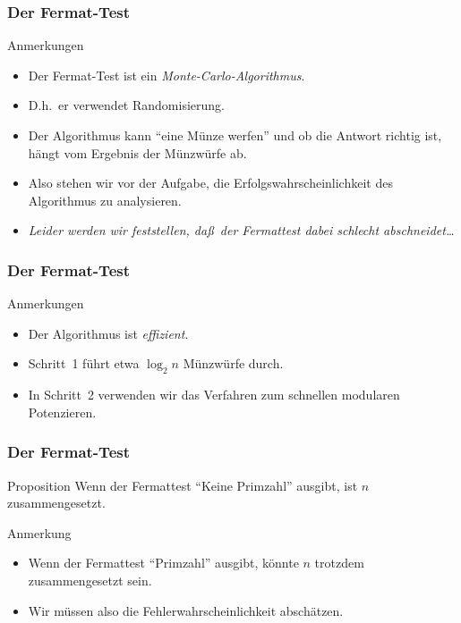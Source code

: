 \documentclass{beamer}
\renewcommand{\emph}[1]{{\textcolor{solarizedRed}{\itshape #1}}}
\renewcommand{\ae}{\"a}
\renewcommand{\oe}{\"o}
\newcommand{\ue}{\"u}
\begin{document}
\begin{frame}\frametitle{Der Fermat-Test}
	\begin{block}{Anmerkungen}
		\begin{itemize}
			\item Der Fermat-Test ist ein \emph{Monte-Carlo-Algorithmus}.
			\item D.h.\ er verwendet Randomisierung.
			\item Der Algorithmus kann ``eine M\ue nze werfen'' und ob die Antwort richtig ist, h\ae ngt vom Ergebnis der M\ue nzw\ue rfe ab.
			\item Also stehen wir vor der Aufgabe, die Erfolgswahrscheinlichkeit des Algorithmus zu analysieren.
			\item \itshape Leider werden wir feststellen, da\ss\ der Fermattest dabei schlecht abschneidet\dots
		\end{itemize}
	\end{block}
\end{frame}

\begin{frame}\frametitle{Der Fermat-Test}
	\begin{block}{Anmerkungen}
		\begin{itemize}
			\item Der Algorithmus ist \emph{effizient}.
			\item Schritt~1 f\ue hrt etwa $\log_2n$ M\ue nzw\ue rfe durch.
			\item In Schritt~2 verwenden wir das Verfahren zum schnellen modularen Potenzieren.
		\end{itemize}
	\end{block}
\end{frame}

\begin{frame}\frametitle{Der Fermat-Test}
	\begin{block}{Proposition}
		Wenn der Fermattest ``Keine Primzahl'' ausgibt, ist $n$ zusammengesetzt.
	\end{block}
	\begin{block}{Anmerkung}
	\begin{itemize}
	\item Wenn der Fermattest ``Primzahl'' ausgibt, \alert{k\oe nnte} $n$ trotzdem zusammengesetzt sein.	
	\item Wir m\ue ssen also die Fehlerwahrscheinlichkeit absch\ae tzen.
	\end{itemize}
	\end{block}
\end{frame}
\end{document}
